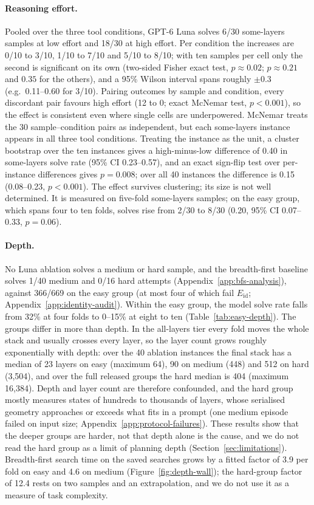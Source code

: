 \paragraph{Reasoning effort.} Pooled over the three tool conditions, GPT-6 Luna solves 6/30
some-layers samples at low effort and 18/30 at high effort. Per condition the increases are
0/10 to 3/10, 1/10 to 7/10 and 5/10 to 8/10; with ten samples per cell only the second is
significant on its own (two-sided Fisher exact test, $p\approx0.02$; $p\approx0.21$ and $0.35$
for the others), and a 95\% Wilson interval spans roughly $\pm0.3$ (e.g.\ 0.11--0.60 for
3/10). Pairing outcomes by sample and condition, every discordant pair favours high effort
(12 to 0; exact McNemar test, $p<0.001$), so the effect is consistent even where single cells
are underpowered. McNemar treats the 30 sample--condition pairs as independent, but each
some-layers instance appears in all three tool conditions. Treating the instance as the unit,
a cluster bootstrap over the ten instances gives a high-minus-low difference of
0.40 in some-layers solve rate (95\% CI 0.23--0.57), and an exact sign-flip test over
per-instance differences gives $p=0.008$; over all 40 instances the difference is 0.15
(0.08--0.23, $p<0.001$). The effect survives clustering; its size is not well determined. It is measured on five-fold some-layers samples; on the easy group, which spans
four to ten folds, solves rise from 2/30 to 8/30 (0.20, 95\% CI 0.07--0.33, $p=0.06$).

\paragraph{Depth.} No Luna ablation solves a medium or hard sample, and the breadth-first
baseline solves 1/40 medium and 0/16 hard attempts (Appendix~\ref{app:bfs-analysis}), against
366/669 on the easy group (at most four of which fail $E_{\mathrm{id}}$; Appendix~\ref{app:identity-audit}). Within the easy group, the model solve rate falls from 32\% at four folds to
0--15\% at eight to ten (Table~\ref{tab:easy-depth}). The groups differ in more than depth. In
the all-layers tier every fold moves the whole stack and usually crosses every layer, so the
layer count grows roughly exponentially with depth: over the 40 ablation instances the final
stack has a median of 23 layers on easy (maximum 64), 90 on medium (448) and 512 on hard (3,504),
and over the full released groups the hard median is 404 (maximum 16,384). Depth and layer count
are therefore confounded, and the hard group mostly measures states of hundreds to thousands of
layers, whose serialised geometry approaches or exceeds what fits in a prompt (one medium
episode failed on input size; Appendix~\ref{app:protocol-failures}). These results show that the
deeper groups are harder, not that depth alone is the cause, and we do not read the hard group as
a limit of planning depth (Section~\ref{sec:limitations}).
Breadth-first search time on the saved searches grows by a fitted factor of 3.9 per fold on easy
and 4.6 on medium (Figure~\ref{fig:depth-wall}); the hard-group factor of 12.4 rests on two samples
and an extrapolation, and we do not use it as a measure of task complexity.

